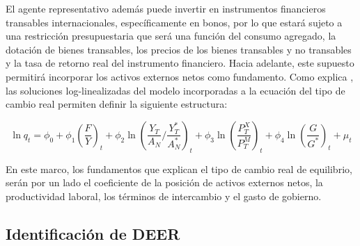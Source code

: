 \documentclass[12pt,letterpaper]{article}
\begin{document}
El agente representativo además puede invertir en instrumentos financieros transables internacionales, específicamente en bonos, por lo que estará sujeto a una restricción presupuestaria que será una función del consumo agregado, la dotación de bienes transables, los precios de los bienes transables y no transables y la tasa de retorno real del instrumento financiero. Hacia adelante, este supuesto permitirá incorporar los activos externos netos como fundamento. Como explica \cite{Calderon2002panel}, las soluciones log-linealizadas del modelo incorporadas a la ecuación del tipo de cambio real permiten definir la siguiente estructura: 

\begin{equation}
\ln q_t=\phi_0+\phi_1\left(\frac{F}{Y}\right)_t+\phi_2\ln\left(\frac{Y_T}{A_N} / \frac{Y_T^*}{A_N^*}\right)_t+\phi_3\ln\left(\frac{P_T^X}{P_T^M}\right)_t+\phi_4\ln\left(\frac{G}{G^*}\right)_t+\mu_t
\end{equation}

En este marco, los fundamentos que explican el tipo de cambio real de equilibrio, serán por un lado el coeficiente de la posición de activos externos netos, la productividad laboral, los términos de intercambio y el gasto de gobierno.  

\subsection*{Identificación de DEER}
\end{document}
